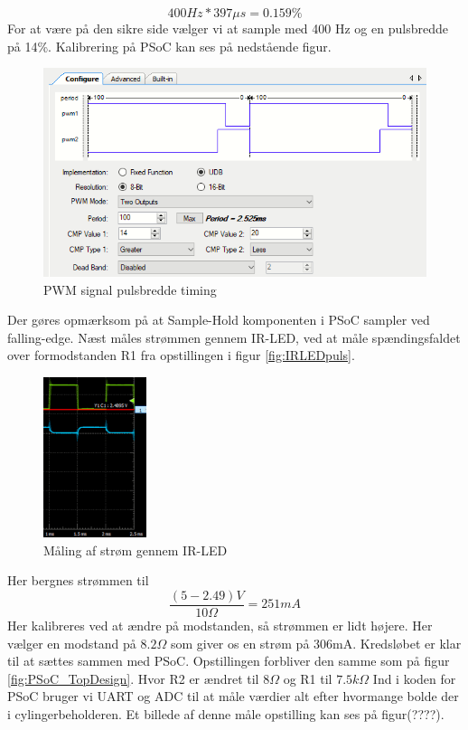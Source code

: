\documentclass[HardwareDesign/HardwareDesign_main.tex]{subfiles}
\begin{document}
$$400Hz*397\mu s=0.159\%$$
For at være på den sikre side vælger vi at sample med 400 Hz og en pulsbredde på 14\%. Kalibrering på PSoC kan ses på nedstående figur.
\newpage
\begin{figure}
    \centering
    \includegraphics[width=1\textwidth]{HardwareDesign/Bolddispenser/graphics/PWM_timing.png}
    \caption{PWM signal pulsbredde timing}
    \label{fig:PWM_timing}
\end{figure}
Der gøres opmærksom på at Sample-Hold komponenten i PSoC sampler ved falling-edge. Næst måles strømmen gennem IR-LED, ved at måle spændingsfaldet over formodstanden R1 fra opstillingen i figur \ref{fig:IRLEDpuls}.
\begin{figure}
    \centering
    \includegraphics[width=0.27\textwidth]{HardwareDesign/Bolddispenser/graphics/Maling2.png}
    \caption{Måling af strøm gennem IR-LED}
    \label{fig:Måling2_AD}
\end{figure}
\newpage
Her bergnes strømmen til 
$$\frac{(5-2.49)V}{10\Omega}=251mA$$
Her kalibreres ved at ændre på modstanden, så strømmen er lidt højere. Her vælger en modstand på $8.2\Omega$ som giver os en strøm på 306mA.
Kredsløbet er klar til at sættes sammen med PSoC. Opstillingen forbliver den samme som på figur \ref{fig:PSoC_TopDesign}. Hvor R2 er ændret til $8\Omega$ og R1 til $7.5k\Omega$
Ind i koden for PSoC bruger vi UART og ADC til at måle værdier alt efter hvormange bolde der i cylingerbeholderen. Et billede af denne måle opstilling kan ses på figur(????).
\end{document}
